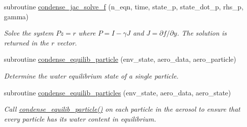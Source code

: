 \begin{DoxyCompactItemize}
subroutine \mbox{\hyperlink{namespacepmc__condense_a08898f52fc6ece673be5cf7afec66e44}{condense\+\_\+jac\+\_\+solve\+\_\+f}} (n\+\_\+eqn, time, state\+\_\+p, state\+\_\+dot\+\_\+p, rhs\+\_\+p, gamma)
\begin{DoxyCompactList}\small\item\em Solve the system $ Pz = r $ where $ P = I - \gamma J $ and $ J = \partial f / \partial y $. The solution is returned in the $ r $ vector. \end{DoxyCompactList}\item 
subroutine \mbox{\hyperlink{namespacepmc__condense_a9439c40ef474d3165689e6c7989ae652}{condense\+\_\+equilib\+\_\+particle}} (env\+\_\+state, aero\+\_\+data, aero\+\_\+particle)
\begin{DoxyCompactList}\small\item\em Determine the water equilibrium state of a single particle. \end{DoxyCompactList}\item 
subroutine \mbox{\hyperlink{namespacepmc__condense_a460fbe02310735e79dc7711a8b048fe2}{condense\+\_\+equilib\+\_\+particles}} (env\+\_\+state, aero\+\_\+data, aero\+\_\+state)
\begin{DoxyCompactList}\small\item\em Call \mbox{\hyperlink{namespacepmc__condense_a9439c40ef474d3165689e6c7989ae652}{condense\+\_\+equilib\+\_\+particle()}} on each particle in the aerosol to ensure that every particle has its water content in equilibrium. \end{DoxyCompactList}\end{DoxyCompactItemize}
